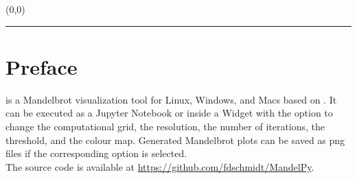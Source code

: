 \documentclass[
  12pt,					%
  a4paper,				%
  twoside,				%
]{report}
\begin{document}

\thispagestyle{empty}


\begin{textblock}{1}(0,0)
    \noindent\textcolor{titleBackground}{\rule{\paperwidth}{.45\paperheight}}
\end{textblock}



{}
{}


{}
{}
{}





\newpage




\thispagestyle{plain}

\tableofcontents

\clearpage
\newpage









\chapter{Preface}

{} is a Mandelbrot visualization tool for Linux, Windows, and Macs based on {}. It can be executed as a Jupyter Notebook or inside a Widget with the option to change the computational grid, the resolution, the number of iterations, the threshold, and the colour map. Generated Mandelbrot plots can be saved as png files if the corresponding option is selected.\\
The source code is available at \url{https://github.com/fdschmidt/MandelPy}.
\end{document}
